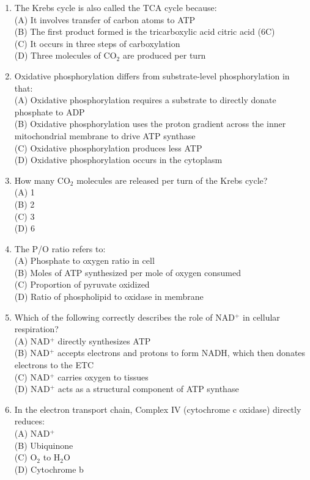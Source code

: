 \documentclass{article}
\begin{document}
\begin{enumerate}[label=Q\arabic*.]
\item The Krebs cycle is also called the TCA cycle because:
\\(A) It involves transfer of carbon atoms to ATP
\\(B) The first product formed is the tricarboxylic acid citric acid (6C)
\\(C) It occurs in three steps of carboxylation
\\(D) Three molecules of CO$_2$ are produced per turn

\item Oxidative phosphorylation differs from substrate-level phosphorylation in that:
\\(A) Oxidative phosphorylation requires a substrate to directly donate phosphate to ADP
\\(B) Oxidative phosphorylation uses the proton gradient across the inner mitochondrial membrane to drive ATP synthase
\\(C) Oxidative phosphorylation produces less ATP
\\(D) Oxidative phosphorylation occurs in the cytoplasm

\item How many CO$_2$ molecules are released per turn of the Krebs cycle?
\\(A) 1
\\(B) 2
\\(C) 3
\\(D) 6

\item The P/O ratio refers to:
\\(A) Phosphate to oxygen ratio in cell
\\(B) Moles of ATP synthesized per mole of oxygen consumed
\\(C) Proportion of pyruvate oxidized
\\(D) Ratio of phospholipid to oxidase in membrane

\item Which of the following correctly describes the role of NAD$^+$ in cellular respiration?
\\(A) NAD$^+$ directly synthesizes ATP
\\(B) NAD$^+$ accepts electrons and protons to form NADH, which then donates electrons to the ETC
\\(C) NAD$^+$ carries oxygen to tissues
\\(D) NAD$^+$ acts as a structural component of ATP synthase

\item In the electron transport chain, Complex IV (cytochrome c oxidase) directly reduces:
\\(A) NAD$^+$
\\(B) Ubiquinone
\\(C) O$_2$ to H$_2$O
\\(D) Cytochrome b


\end{enumerate}
\end{document}
